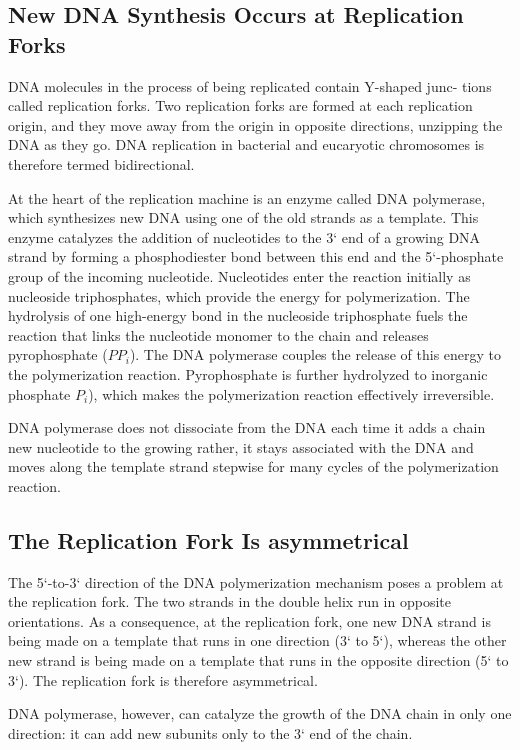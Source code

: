 \subsection{New DNA Synthesis Occurs at Replication Forks}

DNA molecules in the process of being replicated contain Y-shaped junc-
tions called replication forks. Two replication forks are formed at each replication origin, and
they move away from the origin in opposite directions, unzipping the DNA
as they go. DNA replication in bacterial and eucaryotic chromosomes
is therefore termed bidirectional.

At the heart of the replication machine is an enzyme called DNA
polymerase, which synthesizes new DNA using one of the old strands
as a template. This enzyme catalyzes the addition of nucleotides to the 3`
end of a growing DNA strand by forming a phosphodiester bond between
this end and the 5`-phosphate group of the incoming nucleotide.
Nucleotides enter the reaction initially as nucleoside triphosphates,
which provide the energy for polymerization. The hydrolysis of one high-energy
bond in the nucleoside triphosphate fuels the reaction that links
the nucleotide monomer to the chain and releases pyrophosphate ($PP_{i}$).
The DNA polymerase couples the release of this energy to the polymerization
reaction. Pyrophosphate is further hydrolyzed to inorganic
phosphate $P_i$), which makes the polymerization reaction effectively irreversible.

DNA polymerase does not dissociate from the DNA each time it adds a chain
new nucleotide to the growing rather, it stays associated with the
DNA and moves along the template strand stepwise for many cycles of
the polymerization reaction.

\subsection{The Replication Fork Is asymmetrical}

The 5`-to-3` direction of the DNA polymerization mechanism poses a
problem at the replication fork.
The two strands in the double helix run in
opposite orientations. As a consequence, at the replication fork, one new
DNA strand is being made on a template that runs in one direction (3`
to 5`), whereas the other new strand is being made on a template that
runs in the opposite direction (5` to 3`). The replication fork is therefore
asymmetrical.

DNA polymerase, however, can catalyze the growth of the DNA chain in
only one direction: it can add new subunits only to the 3` end of the chain.


